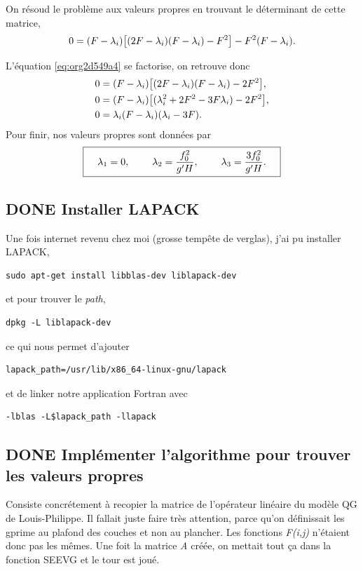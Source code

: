 \documentclass[10pt]{article}
\numberwithin{equation}{section}
\begin{document}
On résoud le problème aux valeurs propres en trouvant le déterminant de cette matrice,
\begin{equation}
\label{eq:org2d549a4}
0 = (F-\lambda_i)\qty[(2F - \lambda_i)(F-\lambda_i) - F^2] - F^2(F-\lambda_i).
\end{equation}

L'équation \ref{eq:org2d549a4} se factorise, on retrouve donc
\begin{align}
&0 = (F-\lambda_i)\qty[(2F - \lambda_i)(F-\lambda_i) - 2F^2],\nonumber\\
&0 = (F-\lambda_i)\qty[(\lambda^2_i + 2F^2 - 3 F \lambda_i) - 2F^2],\nonumber\\
&0 = \lambda_i \qty(F-\lambda_i)\qty(\lambda_i - 3F).
\end{align}
Pour finir, nos valeurs propres sont données par
\begin{align}
\boxed{\hspace{0.4cm} \lambda_1 = 0,
\hspace{0.8cm} \lambda_2 = \frac{f_0^2}{g' H}, 
\hspace{0.8cm} \lambda_3 = \frac{3 f_0^2}{g'H}. \hspace{0.4cm}}   
\end{align}
\subsection{{\bfseries\sffamily DONE} Installer LAPACK}
\label{sec:orga2b46bb}
Une fois internet revenu chez moi (grosse tempête de verglas), j'ai pu installer LAPACK,
\begin{verbatim}
sudo apt-get install libblas-dev liblapack-dev
\end{verbatim}
et pour trouver le \emph{path},
\begin{verbatim}
dpkg -L liblapack-dev
\end{verbatim}
ce qui nous permet d'ajouter
\begin{verbatim}
lapack_path=/usr/lib/x86_64-linux-gnu/lapack
\end{verbatim}
et de linker notre application Fortran avec
\begin{verbatim}
-lblas -L$lapack_path -llapack
\end{verbatim}
\subsection{{\bfseries\sffamily DONE} Implémenter l'algorithme pour trouver les valeurs propres}
\label{sec:org76e4ecf}
Consiste concrétement à recopier la matrice de l'opérateur linéaire du modèle QG de Louis-Philippe.
Il fallait juste faire très attention, parce qu'on définissait les gprime au plafond des couches et non au plancher.
Les fonctions \emph{F(i,j)} n'étaient donc pas les mêmes.
Une foit la matrice \emph{A} créée, on mettait tout ça dans la fonction SEEVG et le tour est joué.
\end{document}
